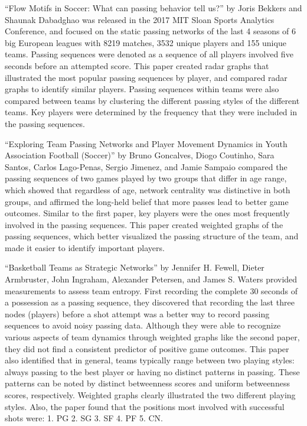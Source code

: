 \documentclass[12pt,twoside]{dukestatscithesis}
\theoremstyle{definition}
\theoremstyle{definition}
\theoremstyle{definition}
\theoremstyle{remark}
\begin{document}
``Flow Motifs in Soccer: What can passing behavior tell us?'' by Joris
Bekkers and Shaunak Dabadghao was released in the 2017 MIT Sloan Sports
Analytics Conference, and focused on the static passing networks of the
last 4 seasons of 6 big European leagues with 8219 matches, 3532 unique
players and 155 unique teams. Passing sequences were denoted as a
sequence of all players involved five seconds before an attempted score.
This paper created radar graphs that illustrated the most popular
passing sequences by player, and compared radar graphs to identify
similar players. Passing sequences within teams were also compared
between teams by clustering the different passing styles of the
different teams. Key players were determined by the frequency that they
were included in the passing sequences.

``Exploring Team Passing Networks and Player Movement Dynamics in Youth
Association Football (Soccer)'' by Bruno Goncalves, Diogo Coutinho, Sara
Santos, Carlos Lago-Penas, Sergio Jimenez, and Jamie Sampaio compared
the passing sequences of two games played by two groups that differ in
age range, which showed that regardless of age, network centrality was
distinctive in both groups, and affirmed the long-held belief that more
passes lead to better game outcomes. Similar to the first paper, key
players were the ones most frequently involved in the passing sequences.
This paper created weighted graphs of the passing sequences, which
better visualized the passing structure of the team, and made it easier
to identify important players.

``Basketball Teams as Strategic Networks'' by Jennifer H. Fewell, Dieter
Armbruster, John Ingraham, Alexander Petersen, and James S. Waters
provided measurements to assess team entropy. First recording the
complete 30 seconds of a possession as a passing sequence, they
discovered that recording the last three nodes (players) before a shot
attempt was a better way to record passing sequences to avoid noisy
passing data. Although they were able to recognize various aspects of
team dynamics through weighted graphs like the second paper, they did
not find a consistent predictor of positive game outcomes. This paper
also identified that in general, teams typically range between two
playing styles: always passing to the best player or having no distinct
patterns in passing. These patterns can be noted by distinct betweenness
scores and uniform betweenness scores, respectively. Weighted graphs
clearly illustrated the two different playing styles. Also, the paper
found that the positions most involved with successful shots were: 1. PG
2. SG 3. SF 4. PF 5. CN.
\end{document}
